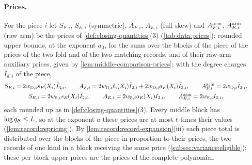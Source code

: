 \paragraph{Prices.}
For the piece $i$ let $S_{F,i}$, $S_{E,i}$ (symmetric), $A_{F,i}$, $A_{E,i}$ (full
skew) and $A^{\rm arm}_{F,i}$, $A^{\rm arm}_{E,i}$ (raw arm) be the prices of
\cref{def:closing-quantities}(3) (\cref{tab:data:prices}): rounded upper bounds,
at the exponent $a_0$, for the sums over the blocks of the piece of the prices of
the two fold and of the two matching records, and of their raw-arm auxiliary
prices, given by \cref{lem:middle-comparison-prices}; with the degree charges
$\bar I_{d,i}$ of the piece,
\begin{gather*}
 S_{F,i}=2w_{{\rm D},i}s_F(X_i)\bar I_{3,i},\qquad
 A_{F,i}=2w_{{\rm D},i}\ell_\mathsf t(X_i)\bar I_{2,i}+2w_{{\rm D},i}a_F(X_i)\bar I_{3,i},\qquad
 A^{\rm arm}_{F,i}=2w_{{\rm D},i}\bar I_{2,i},\\
 S_{E,i}=2w_{{\rm S},i}s_E(X_i)\bar I_{2,i},\qquad
 A_{E,i}=2w_{{\rm S},i}a_E(X_i)\bar I_{2,i},\qquad
 A^{\rm arm}_{E,i}=2w_{{\rm S},i}\bar I_{2,i},
\end{gather*}
each rounded up as in \cref{def:closing-quantities}(3). Every middle block has
$\log q_\mathcal B\le L$, so at the exponent
$a$ these prices are at most $t$ times their values
(\cref{lem:record:repricing}). By \cref{lem:record:record-expansion}(iii) each
piece total is distributed over the blocks of the piece in proportion to their
prices, the two records of one kind in a block receiving the same price
(\cref{subsec:variance:eligible}); these per-block upper prices are the prices of
the complete polynomial.

